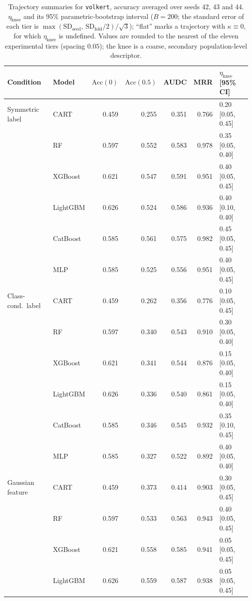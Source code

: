 \begin{table}[p]
\centering
\scriptsize
\setlength{\tabcolsep}{3.5pt}
\caption{Trajectory summaries for \texttt{volkert}, accuracy averaged over seeds 42, 43 and 44. $\eta_{\mathrm{knee}}$ and its 95\% parametric-bootstrap interval ($B=200$; the standard error of each tier is $\max(\mathrm{SD}_{\mathrm{seed}},\,\mathrm{SD}_{\mathrm{fold}}/2)/\sqrt3$); ``flat'' marks a trajectory with $\kappa\equiv 0$, for which $\eta_{\mathrm{knee}}$ is undefined. Values are rounded to the nearest of the eleven experimental tiers (spacing $0.05$); the knee is a coarse, secondary population-level descriptor.}
\label{tab:traj_volkert}
\begin{tabular}{@{}llrrrrl@{}}
\toprule
Condition & Model & $\mathrm{Acc}(0)$ & $\mathrm{Acc}(0.5)$ & AUDC & MRR & $\eta_{\mathrm{knee}}$ [95\% CI] \\
\midrule
Symmetric label & CART & 0.459 & 0.255 & 0.351 & 0.766 & 0.20 [0.05, 0.45] \\
 & RF & 0.597 & 0.552 & 0.583 & 0.978 & 0.35 [0.05, 0.40] \\
 & XGBoost & 0.621 & 0.547 & 0.591 & 0.951 & 0.40 [0.05, 0.45] \\
 & LightGBM & 0.626 & 0.524 & 0.586 & 0.936 & 0.40 [0.10, 0.40] \\
 & CatBoost & 0.585 & 0.561 & 0.575 & 0.982 & 0.45 [0.05, 0.45] \\
 & MLP & 0.585 & 0.525 & 0.556 & 0.951 & 0.40 [0.05, 0.45] \\
\midrule
Class-cond.\ label & CART & 0.459 & 0.262 & 0.356 & 0.776 & 0.10 [0.05, 0.45] \\
 & RF & 0.597 & 0.340 & 0.543 & 0.910 & 0.30 [0.05, 0.40] \\
 & XGBoost & 0.621 & 0.341 & 0.544 & 0.876 & 0.15 [0.05, 0.40] \\
 & LightGBM & 0.626 & 0.336 & 0.540 & 0.861 & 0.15 [0.05, 0.40] \\
 & CatBoost & 0.585 & 0.346 & 0.545 & 0.932 & 0.35 [0.10, 0.45] \\
 & MLP & 0.585 & 0.327 & 0.522 & 0.892 & 0.40 [0.05, 0.40] \\
\midrule
Gaussian feature & CART & 0.459 & 0.373 & 0.414 & 0.903 & 0.30 [0.05, 0.45] \\
 & RF & 0.597 & 0.533 & 0.563 & 0.943 & 0.40 [0.05, 0.45] \\
 & XGBoost & 0.621 & 0.558 & 0.585 & 0.941 & 0.05 [0.05, 0.45] \\
 & LightGBM & 0.626 & 0.559 & 0.587 & 0.938 & 0.05 [0.05, 0.45] \\

\end{tabular}
\end{table}
